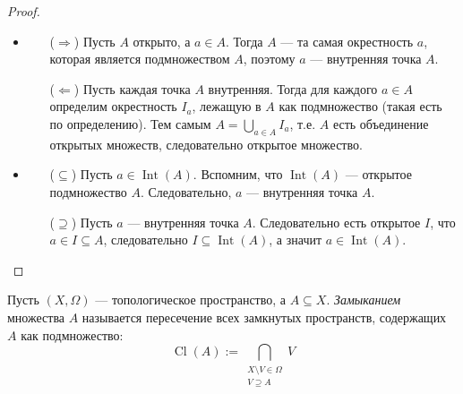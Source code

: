 \documentclass[12pt,a4paper]{article}
\DeclareMathOperator{\Int}{Int}
\DeclareMathOperator{\Cl}{Cl}
\begin{document}
    \begin{proof}\ 
        \begin{itemize}
            \item
                \begin{itemize}
                    \item[($\Rightarrow$)] Пусть $A$ открыто, а $a \in A$. Тогда $A$ --- та самая окрестность $a$, которая является подмножеством $A$, поэтому $a$ --- внутренняя точка $A$.
                    \item[($\Leftarrow$)] Пусть каждая точка $A$ внутренняя. Тогда для каждого $a \in A$ определим окрестность $I_a$, лежащую в $A$ как подмножество (такая есть по определению). Тем самым $A = \bigcup_{a \in A} I_a$, т.е. $A$ есть объединение открытых множеств, следовательно открытое множество.
                \end{itemize}
            \item
                \begin{itemize}
                    \item[($\subseteq$)] Пусть $a \in \Int(A)$. Вспомним, что $\Int(A)$ --- открытое подмножество $A$. Следовательно, $a$ --- внутренняя точка $A$.
                    \item[($\supseteq$)] Пусть $a$ --- внутренняя точка $A$. Следовательно есть открытое $I$, что $a \in I \subseteq A$, следовательно $I \subseteq \Int(A)$, а значит $a \in \Int(A)$.
                \end{itemize}
        \end{itemize}
    \end{proof}

    \begin{definition}
        Пусть $(X, \Omega)$ --- топологическое пространство, а $A \subseteq X$. \emph{Замыканием} множества $A$ называется пересечение всех замкнутых пространств, содержащих $A$ как подмножество:
        \[\Cl(A) := \bigcap_{\substack{X \setminus V \in \Omega\\V\supseteq A}} V\]
    \end{definition}
\end{document}
